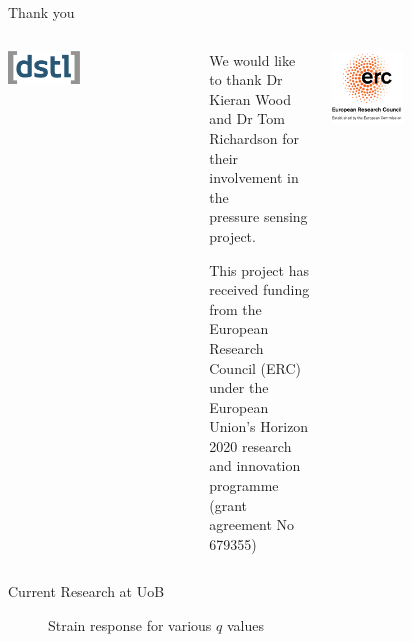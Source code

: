 \documentclass[aspectratio=169]{beamer}            %
\begin{document}
\begin{frame}{}

  \vspace{2.5em}
  \centering
	\Huge{Thank you}

  \vspace{1em}
	\begin{columns}
	  \begin{column}{0.25\textwidth}
		  \centering
      \includegraphics[width=0.4\textwidth]{DstlLogo.eps}
		\end{column}
	  \begin{column}{0.5\textwidth}
		  \centering
			{\tiny We would like to thank Dr Kieran Wood and Dr Tom Richardson for their
			involvement in the\\[1em]
			pressure sensing project.\\[1em]}
			
		  {\tiny This project has received funding from the European Research Council (ERC)\\[1em]
        under the European Union’s Horizon 2020 research and innovation programme\\[1em]
        (grant agreement No 679355)\\[1em]}
    \end{column}
    \begin{column}{0.25\textwidth}
		  \centering
      \includegraphics[width=0.4\textwidth]{ERC_Logo.eps}
		\end{column}
  \end{columns}

\end{frame}

\begin{frame}{Current Research at UoB}

  \begin{figure}[!htb]
    \centering
		
		\caption{Strain response for various ${q}$ values}
		\label{fig:PressureResponse2q}
  \end{figure}

\end{frame}
\end{document}
